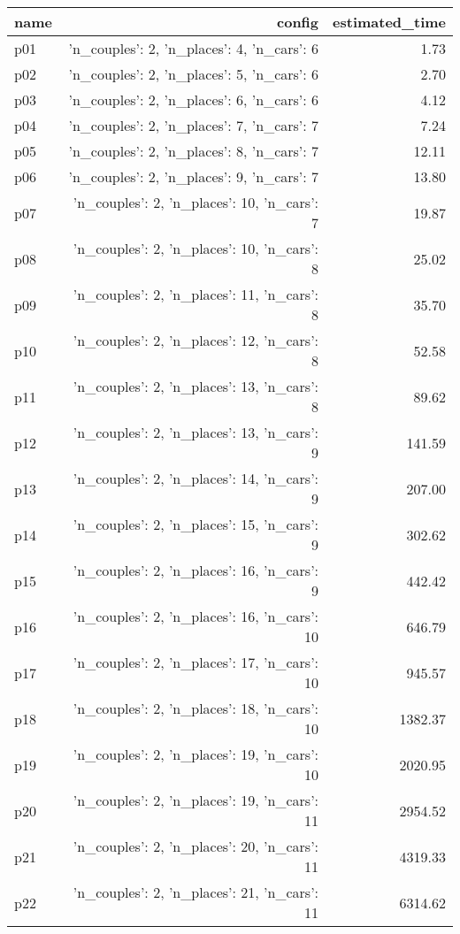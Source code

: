 \documentclass{article}
\begin{document}
                            \begin{center}
                            \scriptsize
                            \begin{tabular}{@{}l|r|r@{}}
                            name & config & estimated\_time\\\midrule
                              p01&{'n\_couples': 2, 'n\_places': 4, 'n\_cars': 6}&1.73\\
  p02&{'n\_couples': 2, 'n\_places': 5, 'n\_cars': 6}&2.70\\
  p03&{'n\_couples': 2, 'n\_places': 6, 'n\_cars': 6}&4.12\\
  p04&{'n\_couples': 2, 'n\_places': 7, 'n\_cars': 7}&7.24\\
  p05&{'n\_couples': 2, 'n\_places': 8, 'n\_cars': 7}&12.11\\
  p06&{'n\_couples': 2, 'n\_places': 9, 'n\_cars': 7}&13.80\\
  p07&{'n\_couples': 2, 'n\_places': 10, 'n\_cars': 7}&19.87\\
  p08&{'n\_couples': 2, 'n\_places': 10, 'n\_cars': 8}&25.02\\
  p09&{'n\_couples': 2, 'n\_places': 11, 'n\_cars': 8}&35.70\\
  p10&{'n\_couples': 2, 'n\_places': 12, 'n\_cars': 8}&52.58\\
  p11&{'n\_couples': 2, 'n\_places': 13, 'n\_cars': 8}&89.62\\
  p12&{'n\_couples': 2, 'n\_places': 13, 'n\_cars': 9}&141.59\\
  p13&{'n\_couples': 2, 'n\_places': 14, 'n\_cars': 9}&207.00\\
  p14&{'n\_couples': 2, 'n\_places': 15, 'n\_cars': 9}&302.62\\
  p15&{'n\_couples': 2, 'n\_places': 16, 'n\_cars': 9}&442.42\\
  p16&{'n\_couples': 2, 'n\_places': 16, 'n\_cars': 10}&646.79\\
  p17&{'n\_couples': 2, 'n\_places': 17, 'n\_cars': 10}&945.57\\
  p18&{'n\_couples': 2, 'n\_places': 18, 'n\_cars': 10}&1382.37\\
  p19&{'n\_couples': 2, 'n\_places': 19, 'n\_cars': 10}&2020.95\\
  p20&{'n\_couples': 2, 'n\_places': 19, 'n\_cars': 11}&2954.52\\
  p21&{'n\_couples': 2, 'n\_places': 20, 'n\_cars': 11}&4319.33\\
  p22&{'n\_couples': 2, 'n\_places': 21, 'n\_cars': 11}&6314.62\\

\end{tabular}
\end{center}
\end{document}
